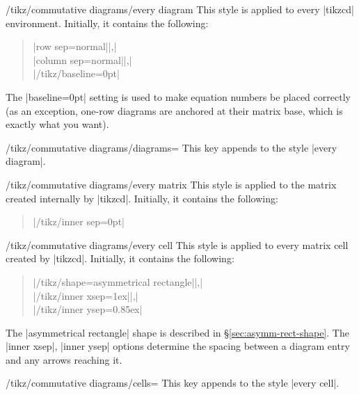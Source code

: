 \documentclass[a4paper]{ltxdoc}
\begin{document}
\begin{stylekey}{/tikz/commutative diagrams/every diagram}
  This style is applied to every |{tikzcd}| environment.  Initially, it
  contains the following:
\begin{verse}
|row sep=normal||,|\\
|column sep=normal||,|\\
|/tikz/baseline=0pt|
\end{verse}
\end{stylekey}

The |baseline=0pt| setting is used to make equation numbers be placed
correctly (as an exception, one-row diagrams are anchored at their
matrix base, which is exactly what you want).

\begin{key}{/tikz/commutative diagrams/diagrams=}
  This key appends  to the style |every diagram|.
\end{key}

\begin{stylekey}{/tikz/commutative diagrams/every matrix}
  This style is applied to the \tikzname{} matrix created internally
  by |{tikzcd}|.  Initially, it contains the following:
\begin{verse}
|/tikz/inner sep=0pt|
\end{verse}
\end{stylekey}

\begin{stylekey}{/tikz/commutative diagrams/every cell}
  This style is applied to every \tikzname{} matrix cell created by
  |{tikzcd}|.  Initially, it contains the following:
\begin{verse}
|/tikz/shape=asymmetrical rectangle||,|\\
|/tikz/inner xsep=1ex||,|\\
|/tikz/inner ysep=0.85ex|
\end{verse}
\end{stylekey}

The |asymmetrical rectangle| shape is described in
\S\ref{sec:asymm-rect-shape}.  The |inner xsep|, |inner ysep| options
determine the spacing between a diagram entry and any arrows reaching
it.

\begin{key}{/tikz/commutative diagrams/cells=}
  This key appends  to the style |every cell|.
\end{key}

\def\printsepaux+#1em{#1\,em}
\def\printsep#1#2{\edef\temp{\pgfkeysvalueof{/tikz/commutative diagrams/#1 sep/#2}}\expandafter\printsepaux\temp}
\end{document}

